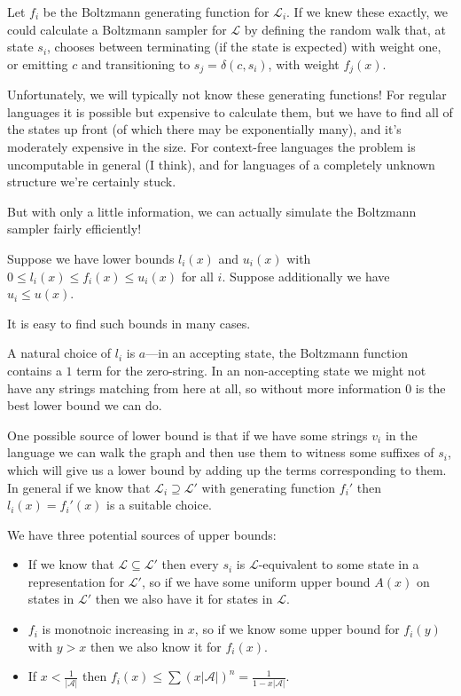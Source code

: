 Let \(f_i\) be the Boltzmann generating function for \(\mathcal{L}_i\).
If we knew these exactly,
we could calculate a Boltzmann sampler for \(\mathcal{L}\) by defining the random walk that,
at state \(s_i\),
chooses between terminating (if the state is expected) with weight one,
or emitting \(c\) and transitioning to \(s_j = \delta(c, s_i)\),
with weight \(f_j(x)\).

Unfortunately, we will typically not know these generating functions!
For regular languages it is possible but expensive to calculate them,
but we have to find all of the states up front (of which there may be exponentially many),
and it's moderately expensive in the size.
For context-free languages the problem is uncomputable in general (I think),
and for languages of a completely unknown structure we're certainly stuck.

But with only a little information,
we can actually simulate the Boltzmann sampler fairly efficiently!

Suppose we have lower bounds \(l_i(x)\) and \(u_i(x)\) with \(0 \leq l_i(x) \leq f_i(x) \leq u_i(x)\) for all \(i\).
Suppose additionally we have \(u_i \leq u(x)\).

It is easy to find such bounds in many cases.

A natural choice of \(l_i\) is \(a\)---in an accepting state,
the Boltzmann function contains a \(1\) term for the zero-string.
In an non-accepting state we might not have any strings matching from here at all,
so without more information \(0\) is the best lower bound we can do.

One possible source of lower bound is that if we have some strings \(v_i\) in the language we can walk the graph and then use them to witness some suffixes of \(s_i\),
which will give us a lower bound by adding up the terms corresponding to them.
In general if we know that \(\mathcal{L}_i \supseteq \mathcal{L}'\) with generating function \(f_i'\) then \(l_i(x) = f_i'(x)\) is a suitable choice.

We have three potential sources of upper bounds:

\begin{itemize}
\item If we know that \(\mathcal{L} \subseteq \mathcal{L}'\) then every \(s_i\) is \(\mathcal{L}\)-equivalent to some state in a representation for \(\mathcal{L}'\),
so if we have some uniform upper bound \(A(x)\) on states in \(\mathcal{L}'\) then we also have it for states in \(\mathcal{L}\).
\item \(f_i\) is monotnoic increasing in \(x\), so if we know some upper bound for \(f_i(y)\) with \(y > x\) then we also know it for \(f_i(x)\).
\item If \(x < \frac{1}{|\mathcal{A}|}\) then \(f_i(x) \leq \sum {(x |\mathcal{A}|)}^n = \frac{1}{1 - x |\mathcal{A}|}\).
\end{itemize}

